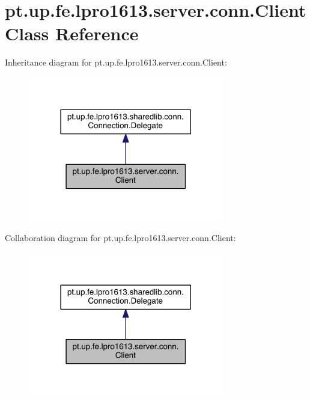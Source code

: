 \hypertarget{classpt_1_1up_1_1fe_1_1lpro1613_1_1server_1_1conn_1_1_client}{}\section{pt.\+up.\+fe.\+lpro1613.\+server.\+conn.\+Client Class Reference}
\label{classpt_1_1up_1_1fe_1_1lpro1613_1_1server_1_1conn_1_1_client}


Inheritance diagram for pt.\+up.\+fe.\+lpro1613.\+server.\+conn.\+Client\+:
\nopagebreak
\begin{figure}[H]
\begin{center}
\leavevmode
\includegraphics[width=242pt]{classpt_1_1up_1_1fe_1_1lpro1613_1_1server_1_1conn_1_1_client__inherit__graph}
\end{center}
\end{figure}


Collaboration diagram for pt.\+up.\+fe.\+lpro1613.\+server.\+conn.\+Client\+:
\nopagebreak
\begin{figure}[H]
\begin{center}
\leavevmode
\includegraphics[width=242pt]{classpt_1_1up_1_1fe_1_1lpro1613_1_1server_1_1conn_1_1_client__coll__graph}
\end{center}
\end{figure}
